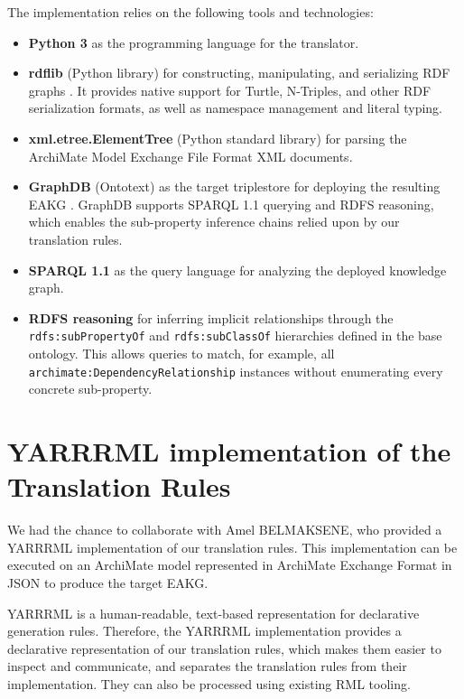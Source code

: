 The implementation relies on the following tools and technologies:

\begin{itemize}
    \item \textbf{Python 3} as the programming language for the translator.
    \item \textbf{rdflib} (Python library) for constructing, manipulating, and serializing RDF graphs \parencite{rdflib2024}. It provides native support for Turtle, N-Triples, and other RDF serialization formats, as well as namespace management and literal typing.
    \item \textbf{xml.etree.ElementTree} (Python standard library) for parsing the ArchiMate Model Exchange File Format XML documents.
    \item \textbf{GraphDB} (Ontotext) as the target triplestore for deploying the resulting EAKG \parencite{ontotext2024graphdb}. GraphDB supports SPARQL 1.1 querying and RDFS reasoning, which enables the sub-property inference chains relied upon by our translation rules.
    \item \textbf{SPARQL 1.1} as the query language for analyzing the deployed knowledge graph.
    \item \textbf{RDFS reasoning} for inferring implicit relationships through the \texttt{rdfs:subPropertyOf} and \texttt{rdfs:subClassOf} hierarchies defined in the base ontology. This allows queries to match, for example, all \texttt{archimate:DependencyRelationship} instances without enumerating every concrete sub-property.
\end{itemize}


\section{YARRRML implementation of the Translation Rules}
\label{sec:yarrrml}

We had the chance to collaborate with Amel BELMAKSENE, who provided a YARRRML implementation of our translation rules. This implementation can be executed on an ArchiMate model represented in ArchiMate Exchange Format in JSON to produce the target EAKG.

YARRRML is a human-readable, text-based representation for declarative generation rules. Therefore, the YARRRML implementation provides a declarative representation of our translation rules, which makes them easier to inspect and communicate, and separates the translation rules from their implementation. They can also be processed using existing RML tooling.